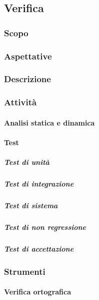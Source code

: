 \subsection{Verifica}

	\subsubsection{Scopo}
	\subsubsection{Aspettative}
	\subsubsection{Descrizione}
	\subsubsection{Attività}
		\paragraph{Analisi statica e dinamica}
		\paragraph{Test}
			\subparagraph*{Test di unità}
			\subparagraph*{Test di integrazione}
			\subparagraph*{Test di sistema}
			\subparagraph*{Test di non regressione}
			\subparagraph*{Test di accettazione}	

	\subsubsection{Strumenti}
		\paragraph{Verifica ortografica}
	